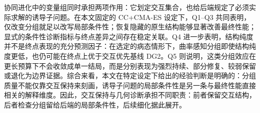 协同进化中的变量组同时承担两项作用：它划定交互集合，也给后端规定了必须实际求解的诱导子问题。在本文固定的 CC+CMA-ES 设定下，Q1--Q3 共同表明，仅改变分组就足以改写局部条件性；恢复隐藏的原生结构能够显著改善最终性能；显式的条件性诊断指标与终点差异之间存在稳定关联。Q4 进一步表明，结构纯度并不是终点表现的充分预测因子：在选定的病态情形下，曲率感知分组即使结构纯度更低，也仍可能在终点上优于交互优先基线 DG2。Q5 则说明，这类分组效应在更长预算下不会收敛成单一结局，而是分别表现为强烈持续、部分修复、较弱保留或退化为边界证据。综合来看，本文在特定设定下给出的经验判断是明确的：分组质量不能仅靠交互保持来刻画，诱导子问题的局部条件性是另一条与最终性能直接相关的解释维度。因此，交互保持与几何诊断承担不同职责：前者保留交互结构，后者检查分组留给后端的局部条件性，后续细化据此展开。
